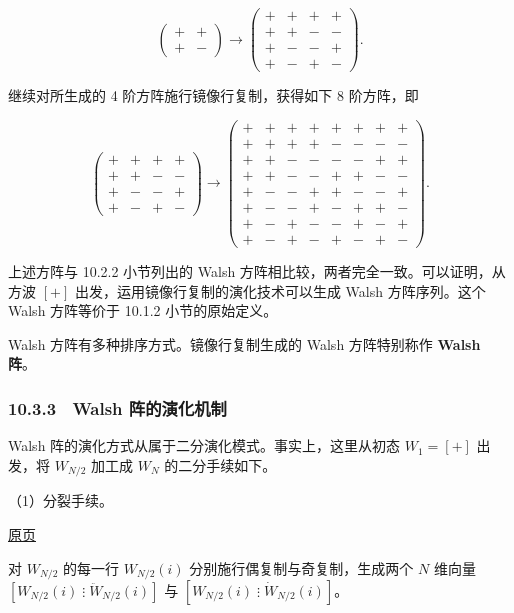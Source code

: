 \documentclass[
  10pt,
  fontset=fandol]{ctexart}
\begin{document}
\[
\begin{pmatrix}+&+\\+&-\end{pmatrix}\longrightarrow
\begin{pmatrix}
+&+&+&+\\
+&+&-&-\\
+&-&-&+\\
+&-&+&-
\end{pmatrix}.
\]

继续对所生成的 4 阶方阵施行镜像行复制，获得如下 8 阶方阵，即

\[
\begin{pmatrix}
+&+&+&+\\
+&+&-&-\\
+&-&-&+\\
+&-&+&-
\end{pmatrix}\longrightarrow
\begin{pmatrix}
+&+&+&+&+&+&+&+\\
+&+&+&+&-&-&-&-\\
+&+&-&-&-&-&+&+\\
+&+&-&-&+&+&-&-\\
+&-&-&+&+&-&-&+\\
+&-&-&+&-&+&+&-\\
+&-&+&-&-&+&-&+\\
+&-&+&-&+&-&+&-
\end{pmatrix}.
\]

上述方阵与 10.2.2 小节列出的 Walsh 方阵相比较，两者完全一致。可以证明，从方波 \([+]\) 出发，运用镜像行复制的演化技术可以生成 Walsh 方阵序列。这个 Walsh 方阵等价于 10.1.2 小节的原始定义。

Walsh 方阵有多种排序方式。镜像行复制生成的 Walsh 方阵特别称作 \textbf{Walsh 阵}。

\subsubsection{10.3.3　Walsh 阵的演化机制}\label{walsh-ux9635ux7684ux6f14ux5316ux673aux5236}

Walsh 阵的演化方式从属于二分演化模式。事实上，这里从初态 \(W_1=[+]\) 出发，将 \(W_{N/2}\) 加工成 \(W_N\) 的二分手续如下。

（1）分裂手续。

\href{../../source-images/pdf-268.jpeg}{原页}

对 \(W_{N/2}\) 的每一行 \(W_{N/2}(i)\) 分别施行偶复制与奇复制，生成两个 \(N\) 维向量 \([W_{N/2}(i)\mathrel{\vdots}\ddot W_{N/2}(i)]\) 与 \([W_{N/2}(i)\mathrel{\vdots}\dot W_{N/2}(i)]\)。
\end{document}
